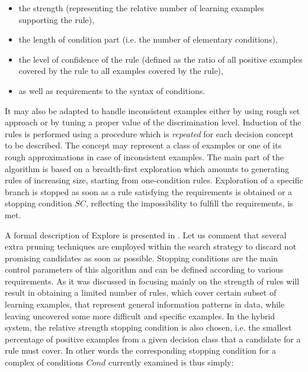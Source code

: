 \documentclass{article}
\begin{document}
\begin{itemize}
\item  the strength (representing the relative number of learning examples
supporting the rule),

\item  the length of condition part (i.e. the number of elementary conditions),

\item  the level of confidence of the rule (defined as the ratio
of all positive examples covered by the rule to all examples
covered by the rule),

\item  as well as requirements to the syntax of conditions.
\end{itemize}

It may also be adapted to handle inconsistent examples either by using rough
set approach \cite{Pawlak,stefanowski97} or by tuning a proper value of the
discrimination level. Induction of the rules is performed using a procedure
which is {\em repeated} for each decision concept to be described. The
concept may represent a class of examples or one of its rough approximations
in case of inconsistent examples. The main part of the algorithm is based on
a breadth-first exploration which amounts to generating rules of increasing
size, starting from one-condition rules. Exploration of a specific branch is
stopped as soon as a rule satisfying the requirements is obtained or a
stopping condition $SC$, reflecting the impossibility to fulfill the
requirements, is met.

A formal description of Explore is presented in \cite{cahier,ii}.
Let us comment that several extra pruning techniques are employed
within the search strategy to discard not promising candidates as
soon as possible. Stopping conditions are the main control
parameters of this algorithm and can be defined according to
various requirements. As it was discussed in \cite{ii} focusing
mainly on the strength of rules will result in obtaining a limited
number of rules, which cover certain subset of learning examples,
that represent general information patterns in data, while leaving
uncovered some more difficult and specific examples. In the hybrid
system, the relative strength stopping condition is also chosen,
i.e. the smallest percentage of positive examples from a given
decision class that a candidate for a rule must cover. In other
words the corresponding stopping condition for a complex of
conditions $Cond$ currently examined is thus simply:
\end{document}
